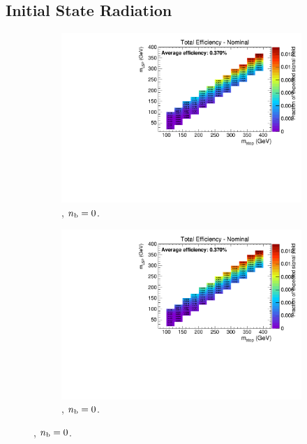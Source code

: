 \newpage
\subsection*{Initial State Radiation}
\label{sec:t2degen_isr_plots}

\begin{figure}[ht!]
  \centering
  \begin{subfigure}[b]{0.32\textwidth}
    \includegraphics[width=\textwidth, page=4]{Figs/sms/t2degen/v5/ISR_T2_4body_v5_eq0b_le3j_incl.pdf}
    \caption{\njlow, $n_{\text{b}} = 0$.}
  \end{subfigure}
  \begin{subfigure}[b]{0.32\textwidth}
    \includegraphics[width=\textwidth, page=5]{Figs/sms/t2degen/v5/ISR_T2_4body_v5_eq0b_le3j_incl.pdf}
    \caption{\njlow, $n_{\text{b}} = 0$.}

\end{subfigure}
\end{figure}
